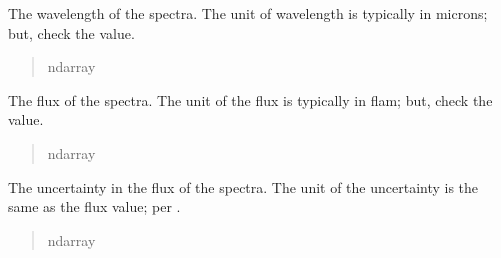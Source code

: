 \documentclass[letterpaper,11pt,english]{sphinxmanual}
\begin{document}
\begin{savenotes}
\begin{fulllineitems}
\begin{savenotes}\begin{fulllineitems}
\label{\detokenize{code/lezargus.container.spectra:lezargus.container.spectra.LezargusSpectra.wavelength}}
\pysigstartsignatures
{}
\pysigstopsignatures
\sphinxAtStartPar
The wavelength of the spectra. The unit of wavelength is typically
in microns; but, check the  value.
\begin{quote}\begin{description}
\sphinxAtStartPar
ndarray

\end{description}\end{quote}

\end{fulllineitems}\end{savenotes}


\begin{savenotes}\begin{fulllineitems}
\label{\detokenize{code/lezargus.container.spectra:lezargus.container.spectra.LezargusSpectra.data}}
\pysigstartsignatures
{}
\pysigstopsignatures
\sphinxAtStartPar
The flux of the spectra. The unit of the flux is typically
in flam; but, check the  value.
\begin{quote}\begin{description}
\sphinxAtStartPar
ndarray

\end{description}\end{quote}

\end{fulllineitems}\end{savenotes}


\begin{savenotes}\begin{fulllineitems}
\label{\detokenize{code/lezargus.container.spectra:lezargus.container.spectra.LezargusSpectra.uncertainty}}
\pysigstartsignatures
{}
\pysigstopsignatures
\sphinxAtStartPar
The uncertainty in the flux of the spectra. The unit of the uncertainty
is the same as the flux value; per .
\begin{quote}\begin{description}
\sphinxAtStartPar
ndarray


\end{description}
\end{quote}
\end{fulllineitems}
\end{savenotes}
\end{fulllineitems}
\end{savenotes}
\end{document}
